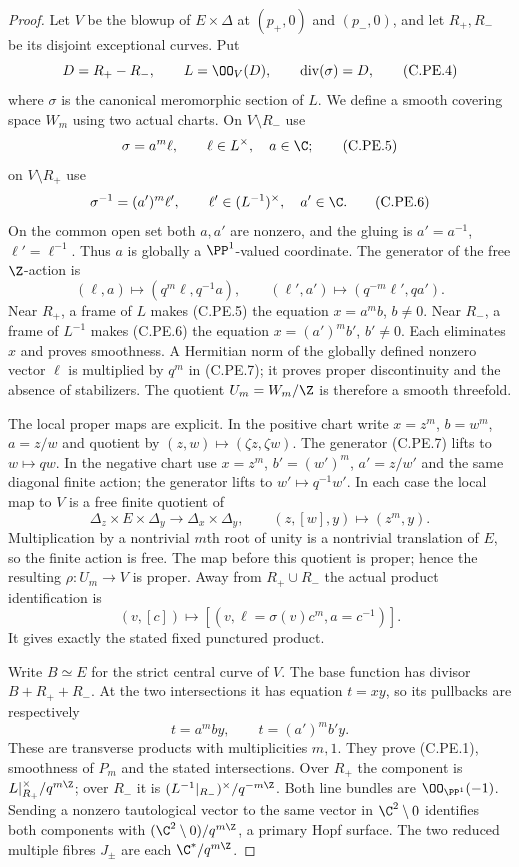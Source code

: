 \begin{proof}
Let $V$ be the blowup of $E\times\Delta$ at
$(p_+,0)$ and $(p_-,0)$, and let $R_+,R_-$ be its
disjoint exceptional curves. Put
\[
 D=R_+-R_-,\qquad L=\OO_V(D),\qquad
 \operatorname{div}(\sigma)=D,                         \tag{C.PE.4}
\]
where $\sigma$ is the canonical meromorphic section of
$L$. We define a smooth covering space $W_m$ using two
actual charts. On $V\setminus R_-$ use
\[
 \sigma=a^m\ell,\qquad \ell\in L^\times,\quad a\in\C;
                                                               \tag{C.PE.5}
\]
on $V\setminus R_+$ use
\[
 \sigma^{-1}=(a')^m\ell',\qquad
 \ell'\in(L^{-1})^\times,\quad a'\in\C.                 \tag{C.PE.6}
\]
On the common open set both $a,a'$ are nonzero, and the
gluing is $a'=a^{-1}$, $\ell'=\ell^{-1}$. Thus $a$
is globally a $\PP^1$-valued coordinate. The generator
of the free $\Z$-action is
\[
 (\ell,a)\longmapsto(q^m\ell,q^{-1}a),\qquad
 (\ell',a')\longmapsto(q^{-m}\ell',qa').                 \tag{C.PE.7}
\]
Near $R_+$, a frame of $L$ makes (C.PE.5) the equation
$x=a^m b$, $b\ne0$. Near $R_-$, a frame of $L^{-1}$
makes (C.PE.6) the equation $x=(a')^m b'$, $b'\ne0$.
Each eliminates $x$ and proves smoothness. A Hermitian
norm of the globally defined nonzero vector $\ell$ is
multiplied by $q^m$ in (C.PE.7); it proves proper
discontinuity and the absence of stabilizers. The
quotient $U_m=W_m/\Z$ is therefore a smooth threefold.

The local proper maps are explicit. In the positive
chart write $x=z^m$, $b=w^m$, $a=z/w$ and quotient
by $(z,w)\mapsto(\zeta z,\zeta w)$. The generator
(C.PE.7) lifts to $w\mapsto qw$. In the negative
chart use $x=z^m$, $b'=(w')^m$, $a'=z/w'$ and the
same diagonal finite action; the generator lifts to
$w'\mapsto q^{-1}w'$. In each case the local map to
$V$ is a free finite quotient of
\[
 \Delta_z\times E\times\Delta_y
   \longrightarrow\Delta_x\times\Delta_y,\qquad
 (z,[w],y)\longmapsto(z^m,y).                           \tag{C.PE.8}
\]
Multiplication by a nontrivial $m$th root of unity is a
nontrivial translation of $E$, so the finite action is
free. The map before this quotient is proper; hence
the resulting $\rho:U_m\to V$ is proper. Away from
$R_+\cup R_-$ the actual product identification is
\[
 (v,[c])\longmapsto[(v,\ell=\sigma(v)c^m,a=c^{-1})].     \tag{C.PE.9}
\]
It gives exactly the stated fixed punctured product.

Write $B\simeq E$ for the strict central curve of $V$.
The base function has divisor $B+R_++R_-$. At the two
intersections it has equation $t=xy$, so its pullbacks
are respectively
\[
                   t=a^mby,\qquad t=(a')^m b'y.         \tag{C.PE.10}
\]
These are transverse products with multiplicities
$m,1$. They prove (C.PE.1), smoothness of $P_m$ and
the stated intersections. Over $R_+$ the component is
$L|_{R_+}^{\times}/q^{m\Z}$; over $R_-$ it is
$(L^{-1}|_{R_-})^{\times}/q^{-m\Z}$. Both line bundles
are $\OO_{\PP^1}(-1)$. Sending a nonzero tautological
vector to the same vector in $\C^2\setminus0$ identifies
both components with
$(\C^2\setminus0)/q^{m\Z}$, a primary Hopf surface.
The two reduced multiple fibres $J_\pm$ are each
$\C^*/q^{m\Z}$.


\end{proof}
